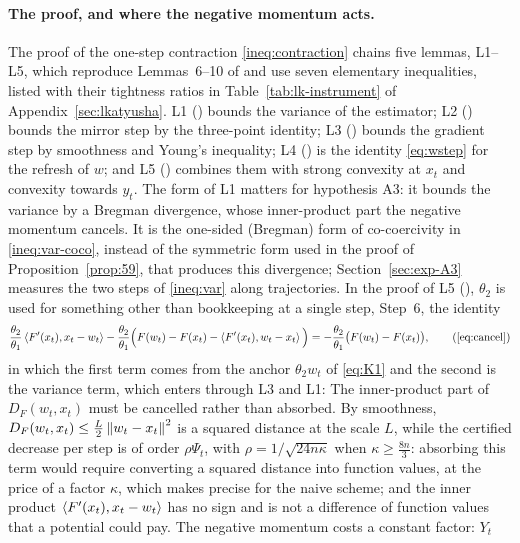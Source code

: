 \paragraph{The proof, and where the negative momentum acts.}
The proof of the one-step contraction \eqref{ineq:contraction} chains five lemmas, L1--L5, which reproduce Lemmas~6--10
of \cite{kovalev2020dont} and use seven elementary inequalities, listed with their tightness ratios in
Table~\ref{tab:lk-instrument} of Appendix~\ref{sec:lkatyusha}. L1 () bounds the variance of the
estimator; L2 () bounds the mirror step by the three-point identity; L3 () bounds the
gradient step by smoothness and Young's inequality; L4 () is the identity \eqref{eq:wstep} for the
refresh of $w$; and L5 () combines them with strong convexity at $x_t$ and convexity towards $y_t$. The
form of L1 matters for hypothesis A3: it bounds the variance by a Bregman divergence, whose inner-product part the
negative momentum cancels.
It is the one-sided (Bregman) form of co-coercivity in \eqref{ineq:var-coco}, instead of the symmetric form used in the
proof of Proposition~\ref{prop:59}, that produces this divergence; Section~\ref{sec:exp-A3} measures the two steps of
\eqref{ineq:var} along trajectories. In the proof of L5 (), $\theta_2$ is used for something other
than bookkeeping at a single step, Step~6, the identity
\begin{equation*}
\frac{\theta_2}{\theta_1}\inner{\Fp(x_t)}{x_t-w_t}-\frac{\theta_2}{\theta_1}\Big(F(w_t)-F(x_t)-\inner{\Fp(x_t)}{w_t-x_t}\Big)=-\frac{\theta_2}{\theta_1}\big(F(w_t)-F(x_t)\big),\tag{\ref*{eq:cancel}}
\end{equation*}
in which the first term comes from the anchor $\theta_2w_t$ of \eqref{eq:K1} and the second is the variance term, which
enters through L3 and L1:
The inner-product part of $D_F(w_t,x_t)$ must be cancelled rather than absorbed. By smoothness,
$D_F(w_t,x_t)\le\frac L2\left\|w_t-x_t\right\|^2$ is a squared distance at the scale $L$, while the certified decrease per step
is of order $\rho\Psi_t$, with $\rho=1/\sqrt{24n\kappa}$ when $\kappa\ge\frac{8n}3$: absorbing this term would require
converting a squared distance into function values, at the price of a factor $\kappa$, which 
makes precise for the naive scheme; and the inner product $\left\langle F'(x_t), x_t-w_t \right\rangle$ has no sign and is not a
difference of function values that a potential could pay. The negative momentum costs a constant factor: $Y_t$
